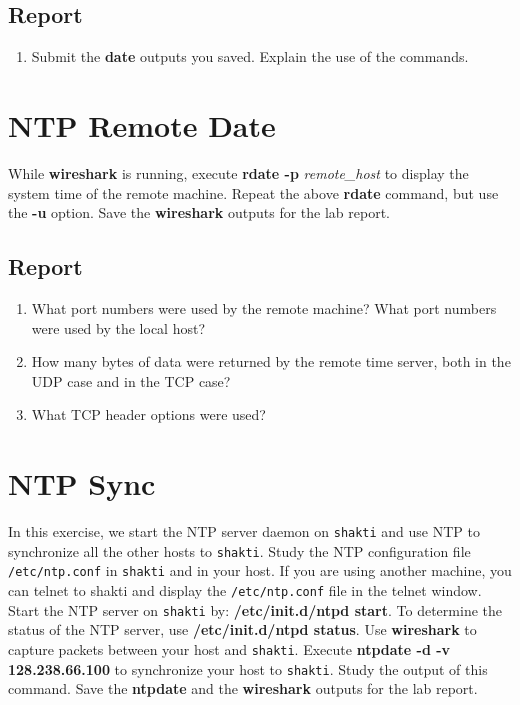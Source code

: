 \documentclass[10pt,a4paper]{article}
\numberwithin{equation}{section}
\numberwithin{figure}{section}
\numberwithin{table}{section}
\begin{document}
    \subsection*{Report}
    \begin{enumerate}
        \item Submit the \textbf{date} outputs you saved.
        Explain the use of the commands.
    \end{enumerate}

    \section{NTP Remote Date}
    While \textbf{wireshark} is running, execute \textbf{rdate -p} \textit{remote\_host} to display the system time of the remote machine.
    Repeat the above \textbf{rdate} command, but use the \textbf{-u} option.
    Save the \textbf{wireshark} outputs for the lab report.

    \subsection*{Report}
    \begin{enumerate}
        \item What port numbers were used by the remote machine?
        What port numbers were used by the local host?
        \item How many bytes of data were returned by the remote time server, both in the UDP case and in the TCP case?
        \item What TCP header options were used?
    \end{enumerate}

    \section{NTP Sync}
    In this exercise, we start the NTP server daemon on \texttt{shakti} and use NTP to
    synchronize all the other hosts to \texttt{shakti}.
    Study the NTP configuration file \texttt{/etc/ntp.conf} in \texttt{shakti} and in your host.
    If you are using another machine, you can telnet to shakti and display the \texttt{/etc/ntp.conf} file in the telnet window.
    Start the NTP server on \texttt{shakti} by: \textbf{/etc/init.d/ntpd start}.
    To determine the status of the NTP server, use \textbf{/etc/init.d/ntpd status}.
    Use \textbf{wireshark} to capture packets between your host and \texttt{shakti}.
    Execute \textbf{ntpdate -d -v 128.238.66.100} to synchronize your host to \texttt{shakti}.
    Study the output of this command.
    Save the \textbf{ntpdate} and the \textbf{wireshark} outputs for the lab report.
\end{document}
